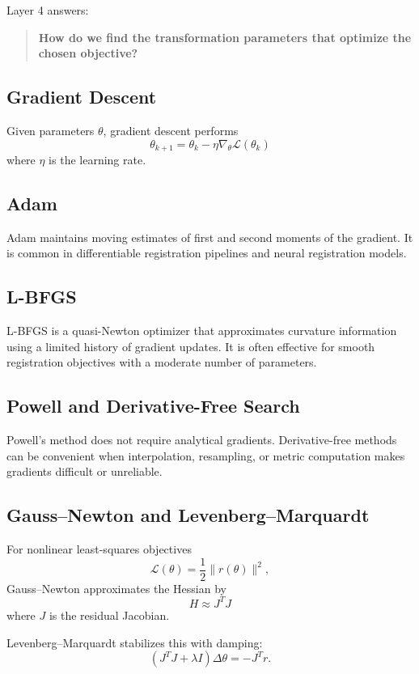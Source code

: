 \documentclass[11pt,a4paper]{article}
\newcommand{\Loss}{\mathcal{L}}
\begin{document}
Layer 4 answers:

\begin{quote}
\textbf{How do we find the transformation parameters that optimize the chosen objective?}
\end{quote}

\subsection{Gradient Descent}

Given parameters $\theta$, gradient descent performs
\[
\theta_{k+1}
=
\theta_k
-
\eta\nabla_\theta\Loss(\theta_k)
\]
where $\eta$ is the learning rate.

\subsection{Adam}

Adam maintains moving estimates of first and second moments of the gradient. It is common in differentiable registration pipelines and neural registration models.

\subsection{L-BFGS}

L-BFGS is a quasi-Newton optimizer that approximates curvature information using a limited history of gradient updates. It is often effective for smooth registration objectives with a moderate number of parameters.

\subsection{Powell and Derivative-Free Search}

Powell's method does not require analytical gradients. Derivative-free methods can be convenient when interpolation, resampling, or metric computation makes gradients difficult or unreliable.

\subsection{Gauss--Newton and Levenberg--Marquardt}

For nonlinear least-squares objectives
\[
\Loss(\theta)=\frac{1}{2}\|r(\theta)\|^2,
\]
Gauss--Newton approximates the Hessian by
\[
H\approx J^TJ
\]
where $J$ is the residual Jacobian.

Levenberg--Marquardt stabilizes this with damping:
\[
(J^TJ+\lambda I)\Delta\theta=-J^Tr.
\]
\end{document}

